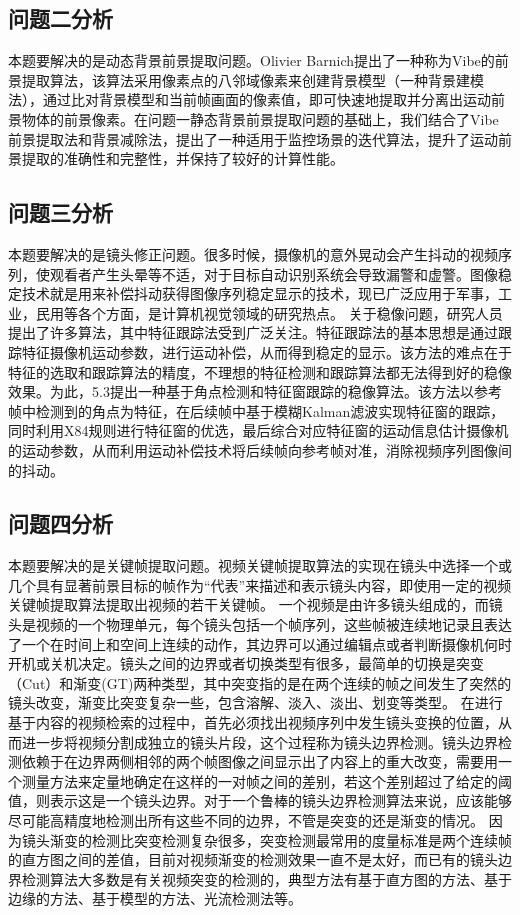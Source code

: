 \documentclass[bwprint]{gmcmthesis}
\begin{document}
\subsection{问题二分析}
本题要解决的是动态背景前景提取问题。Olivier Barnich提出了一种称为Vibe的前景提取算法，该算法采用像素点的八邻域像素来创建背景模型（一种背景建模法），通过比对背景模型和当前帧画面的像素值，即可快速地提取并分离出运动前景物体的前景像素。在问题一静态背景前景提取问题的基础上，我们结合了Vibe前景提取法和背景减除法，提出了一种适用于监控场景的迭代算法，提升了运动前景提取的准确性和完整性，并保持了较好的计算性能。

\subsection{问题三分析}
本题要解决的是镜头修正问题。很多时候，摄像机的意外晃动会产生抖动的视频序列，使观看者产生头晕等不适，对于目标自动识别系统会导致漏警和虚警。图像稳定技术就是用来补偿抖动获得图像序列稳定显示的技术，现已广泛应用于军事，工业，民用等各个方面，是计算机视觉领域的研究热点。
    关于稳像问题，研究人员提出了许多算法，其中特征跟踪法受到广泛关注。特征跟踪法的基本思想是通过跟踪特征摄像机运动参数，进行运动补偿，从而得到稳定的显示。该方法的难点在于特征的选取和跟踪算法的精度，不理想的特征检测和跟踪算法都无法得到好的稳像效果。为此，5.3提出一种基于角点检测和特征窗跟踪的稳像算法。该方法以参考帧中检测到的角点为特征，在后续帧中基于模糊Kalman滤波实现特征窗的跟踪，同时利用X84规则进行特征窗的优选，最后综合对应特征窗的运动信息估计摄像机的运动参数，从而利用运动补偿技术将后续帧向参考帧对准，消除视频序列图像间的抖动。

\subsection{问题四分析}
本题要解决的是关键帧提取问题。视频关键帧提取算法的实现在镜头中选择一个或几个具有显著前景目标的帧作为“代表”来描述和表示镜头内容，即使用一定的视频关键帧提取算法提取出视频的若干关键帧。
一个视频是由许多镜头组成的，而镜头是视频的一个物理单元，每个镜头包括一个帧序列，这些帧被连续地记录且表达了一个在时间上和空间上连续的动作，其边界可以通过编辑点或者判断摄像机何时开机或关机决定。镜头之间的边界或者切换类型有很多，最简单的切换是突变（Cut）和渐变(GT)两种类型，其中突变指的是在两个连续的帧之间发生了突然的镜头改变，渐变比突变复杂一些，包含溶解、淡入、淡出、划变等类型。
在进行基于内容的视频检索的过程中，首先必须找出视频序列中发生镜头变换的位置，从而进一步将视频分割成独立的镜头片段，这个过程称为镜头边界检测。镜头边界检测依赖于在边界两侧相邻的两个帧图像之间显示出了内容上的重大改变，需要用一个测量方法来定量地确定在这样的一对帧之间的差别，若这个差别超过了给定的阈值，则表示这是一个镜头边界。对于一个鲁棒的镜头边界检测算法来说，应该能够尽可能高精度地检测出所有这些不同的边界，不管是突变的还是渐变的情况。
因为镜头渐变的检测比突变检测复杂很多，突变检测最常用的度量标准是两个连续帧的直方图之间的差值，目前对视频渐变的检测效果一直不是太好，而已有的镜头边界检测算法大多数是有关视频突变的检测的，典型方法有基于直方图的方法、基于边缘的方法、基于模型的方法、光流检测法等。
\end{document}
